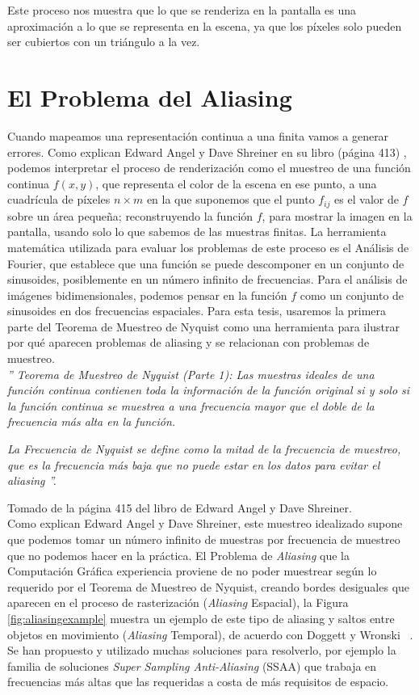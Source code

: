 \documentclass{cslthse-msc}
\begin{document}
Este proceso nos muestra que lo que se renderiza en la pantalla es una aproximación a lo que se representa en la escena, ya que los píxeles solo pueden ser cubiertos con un triángulo a la vez. \cite{Moller2007, Doggett2017EDAN35}


\section{El Problema del Aliasing}
Cuando mapeamos una representación continua a una finita vamos a generar errores. Como explican Edward Angel y Dave Shreiner en su libro (página 413) \cite{Shreiner2011}, podemos interpretar el proceso de renderización como el muestreo de una función continua $f(x, y)$, que representa el color de la escena en ese punto, a una cuadrícula de píxeles $n\times m$ en la que suponemos que el punto $f_{ij}$ es el valor de $f$ sobre un área pequeña; reconstruyendo la función $f$, para mostrar la imagen en la pantalla, usando solo lo que sabemos de las muestras finitas. La herramienta matemática utilizada para evaluar los problemas de este proceso es el Análisis de Fourier, que establece que una función se puede descomponer en un conjunto de sinusoides, posiblemente en un número infinito de frecuencias. Para el análisis de imágenes bidimensionales, podemos pensar en la función $f$ como un conjunto de sinusoides en dos frecuencias espaciales.
Para esta tesis, usaremos la primera parte del Teorema de Muestreo de Nyquist como una herramienta para ilustrar por qué aparecen problemas de aliasing y se relacionan con problemas de muestreo. \\

\emph{'' Teorema de Muestreo de Nyquist (Parte 1): Las muestras ideales de una función continua contienen toda la información de la función original si y solo si la función continua se muestrea a una frecuencia mayor que el doble de la frecuencia más alta en la función. }

\emph{La Frecuencia de Nyquist se define como la mitad de la frecuencia de muestreo, que es la frecuencia más baja que no puede estar en los datos para evitar el \textit{aliasing} ''.
} 


Tomado de la página 415 del libro de Edward Angel y Dave Shreiner. \cite{Shreiner2011} \\

Como explican Edward Angel y Dave Shreiner, este muestreo idealizado supone que podemos tomar un número infinito de muestras por frecuencia de muestreo que no podemos hacer en la práctica. El Problema de \textit{Aliasing} que la Computación Gráfica experiencia proviene de no poder muestrear según lo requerido por el Teorema de Muestreo de Nyquist, creando bordes desiguales que aparecen en el proceso de rasterización (\textit{Aliasing} Espacial), la Figura \ref{fig:aliasingexample} muestra un ejemplo de este tipo de aliasing y saltos entre objetos en movimiento (\textit{Aliasing} Temporal), de acuerdo con Doggett y Wronski ~\cite{Doggett2017EDAN35, Wronski2014}. Se han propuesto y utilizado muchas soluciones para resolverlo, por ejemplo la familia de soluciones \textit{Super Sampling Anti-Aliasing} (SSAA) que trabaja en frecuencias más altas que las requeridas a costa de más requisitos de espacio.
\end{document}
